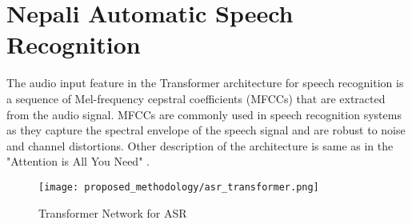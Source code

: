 \section{Nepali Automatic Speech Recognition}
The audio input feature in the Transformer architecture for speech recognition is a sequence of Mel-frequency cepstral coefficients (MFCCs) that are extracted from the audio signal. MFCCs are commonly used in speech recognition systems as they capture the spectral envelope of the speech signal and are robust to noise and channel distortions. Other description of the architecture is same as in the "Attention is All You Need" \cite{NIPS2017_3f5ee243}.

\begin{figure}[H]
    \centering
    \texttt{[image: proposed\_methodology/asr\_transformer.png]}
    \caption{Transformer Network for ASR \cite{pham2019very}}
    \label{fig:Transformer Network for ASR}
\end{figure}



